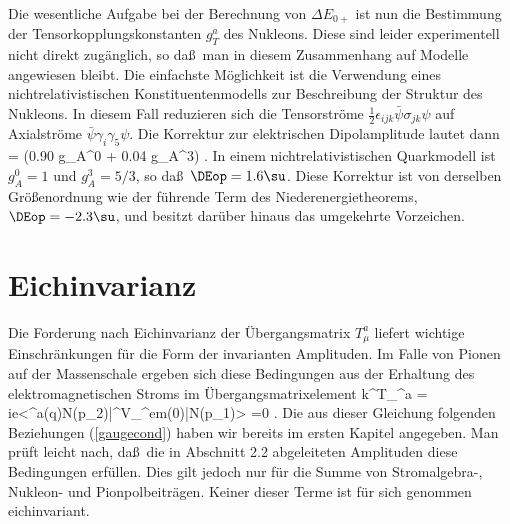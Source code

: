 Die wesentliche Aufgabe bei der Berechnung von $\Delta E_{0+}$
ist nun die Bestimmung der Tensorkopplungskonstanten
$g_T^{a}$ des Nukleons. Diese sind leider experimentell
nicht direkt zug\"anglich, so da\ss\ man in diesem 
Zusammenhang auf Modelle angewiesen bleibt.
Die einfachste M\"oglichkeit ist die Verwendung eines
nichtrelativistischen Konstituentenmodells zur 
Beschreibung der Struktur des Nukleons. In diesem Fall
reduzieren sich die Tensorstr\"ome $\frac{1}{2}\epsilon_{ijk}
\bar{\psi}\sigma_{jk}\psi$ auf Axialstr\"ome $\bar{\psi}
\gamma_i\gamma_5 \psi$. Die Korrektur zur elektrischen 
Dipolamplitude lautet dann
\be
 \DEop = 
    (0.90 \cdot g_A^0 + 0.04 \cdot g_A^3) \; .
\ee
In einem nichtrelativistischen Quarkmodell ist $g_A^0=1$ und $g_A^3=5/3$,
so da\ss\ $\DEop = 1.6 \su$. Diese Korrektur ist von derselben 
Gr\"o\ss enordnung wie der f\"uhrende Term des Niederenergietheorems,
$\DEop = -2.3\su$, und besitzt dar\"uber hinaus das umgekehrte Vorzeichen.
        

\section{Eichinvarianz}
Die Forderung nach Eichinvarianz der \"Ubergangsmatrix $T_\mu^{a}$
liefert wichtige Einschr\"ankungen f\"ur die Form der invarianten Amplituden.
Im Falle von Pionen auf der Massenschale ergeben sich diese 
Bedingungen aus der Erhaltung des elektromagnetischen Stroms
im \"Ubergangsmatrixelement
\be
\label{ongi}
k^\mu T_\mu^{a} = ie<\pi^{a}(q)N(p_2)|\partial^\mu V_\mu^{em}(0)|N(p_1)>
=0 \; .
\ee
Die aus dieser Gleichung folgenden Beziehungen (\ref{gaugecond}) haben 
wir bereits im ersten Kapitel angegeben. Man pr\"uft leicht nach, da\ss\ 
die in Abschnitt 2.2 abgeleiteten Amplituden diese Bedingungen erf\"ullen.
Dies gilt jedoch nur f\"ur die Summe von Stromalgebra-, Nukleon- und
Pionpolbeitr\"agen. Keiner dieser Terme ist f\"ur sich genommen 
eichinvariant. 

